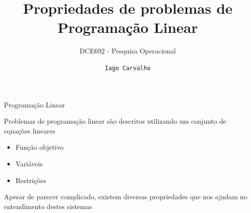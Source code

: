 \documentclass[compress,mathserif]{beamer}
\title{Propriedades de problemas de Programação Linear}
\subtitle{DCE692 - Pesquisa Operacional}
\author{\texttt{Iago Carvalho}}
\institute{\texttt{Departamento de Ciência da Computação}}
\begin{document}
\begin{frame}
\titlepage

\end{frame}


\begin{frame}{Programação Linear}

Problemas de programação linear são descritos utilizando um conjunto de equações lineares
\begin{itemize}
    \item Função objetivo
    \item Variáveis
    \item Restrições
\end{itemize}

\vspace{0.5cm}

Apesar de parecer complicado, existem diversas propriedades que nos ajudam no entendimento destes sistemas

\end{frame}

\end{document}

